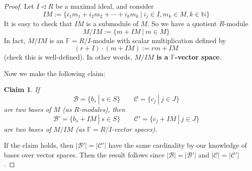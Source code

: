 \documentclass[12pt]{amsbook}
\newtheorem*{claim}{Claim}
\begin{document}
\begin{proof}
Let $I\triangleleft R$ be a maximal ideal, and consider $$IM:= \{i_1m_1 + i_2m_2 +\cdots + i_km_k\ |\ i_j\in I, m_k\in M, k\in \mathbb{N} \}$$
    It is easy to check that $IM$ is a submodule of $M$. So we have a quotient $R$-module $$M/IM:= \{m+IM\ |\ m\in M\}$$ 
    In fact, $M/IM$ is an $\mathbb{F} = R/I$-module with  scalar multiplication defined by $$(r+I)\cdot (m+IM):=rm+IM$$ (check this is well-defined). In other words, {\bf $M/IM$ is a $\mathbb{F}$-vector space}.

\medskip
    Now we make the following claim:
    \begin{claim}
    If 
    $$\mathcal{B}=\{b_s\ |\ s\in S\} \quad \quad \mathcal{C}=\{c_j\ |\ j \in J\}$$ are two bases of $M$ (as $R$-modules), then $$\mathcal{B}'=\{b_s+IM\ |\ s\in S\} \quad \quad \mathcal{C}'=\{c_j+IM\ |\ j\in J\}$$ 
    are two bases of $M/IM$ (as $\mathbb{F}= R/I$-vector spaces).
    \end{claim}
    If the claim holds, then $|\mathcal{B}'| = |\mathcal{C}'|$ have the same cardinality by our knowledge of bases over vector spaces. Then the result follows since $|\mathcal{B}| = |\mathcal{B}'|$ and $|\mathcal{C}| = |\mathcal{C}'|$.


\end{proof}
\end{document}
